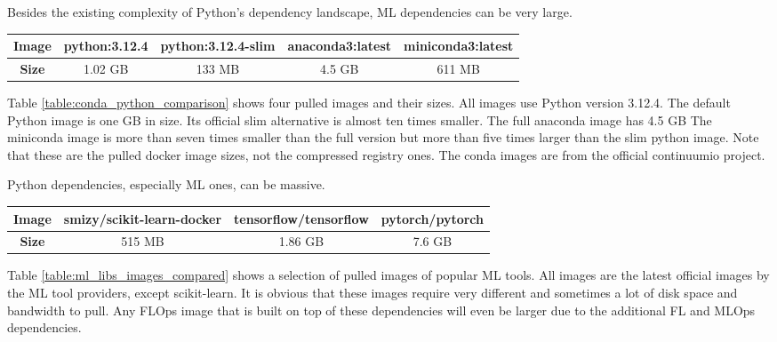 Besides the existing complexity of Python's dependency landscape, ML dependencies can be very large.
\begin{changemargin}{0cm}{0cm}
    \centering
    \begin{tabular}{|c||c|c|c|c|}
        \hline
            \textbf{Image} & python:3.12.4 & python:3.12.4-slim & anaconda3:latest & miniconda3:latest \\
        \hline
            \textbf{Size} & 1.02 GB & 133 MB & 4.5 GB & 611 MB
        \\
        \hline
    \end{tabular}
    \label{table:conda_python_comparison}
\end{changemargin}

Table \ref{table:conda_python_comparison} shows four pulled images and their sizes.
All images use Python version 3.12.4.
The default Python image is one GB in size.
Its official slim alternative is almost ten times smaller.
The full anaconda image has 4.5 GB
The miniconda image is more than seven times smaller than the full version but more than five times larger than the slim python image.
Note that these are the pulled docker image sizes, not the compressed registry ones.
The conda images are from the official continuumio project.

Python dependencies, especially ML ones, can be massive.
\begin{changemargin}{0cm}{0cm}
    \centering
    \begin{tabular}{|c||c|c|c|}
        \hline
            \textbf{Image} & smizy/scikit-learn-docker & tensorflow/tensorflow & pytorch/pytorch \\
        \hline
            \textbf{Size} & 515 MB & 1.86 GB & 7.6 GB
        \\
        \hline
    \end{tabular}
    \label{table:ml_libs_images_compared}
\end{changemargin}

Table \ref{table:ml_libs_images_compared} shows a selection of pulled images of popular ML tools.
All images are the latest official images by the ML tool providers, except scikit-learn.
It is obvious that these images require very different and sometimes a lot of disk space and bandwidth to pull.
Any FLOps image that is built on top of these dependencies will even be larger due to the additional FL and MLOps dependencies.
